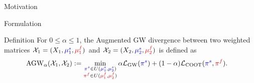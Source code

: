\documentclass{beamer}
\newcommand{\gw}{\text{GW}}
\newcommand{\coot}{\text{COOT}}
\newcommand{\agw}{\text{AGW}}
\newcommand{\cX}{\mathcal X}
\newcommand{\cL}{\mathcal L}
\newcommand{\pis}{{\color{blue}{\pi^s}}}
\newcommand{\pif}{{\color{red}{\pi^f}}}
\newcommand{\mfsrc}{{\color{red}{\mu_1^f}}}
\newcommand{\mftg}{{\color{red}{\mu_2^f}}}
\newcommand{\mssrc}{{\color{blue}{\mu_1^s}}}
\newcommand{\mstg}{{\color{blue}{\mu_2^s}}}
\begin{document}
\begin{frame}{Motivation}
\end{frame}

\begin{frame}{Formulation}
\scriptsize
\begin{block}{Definition}
  For $0\leq \alpha \leq 1$, the Augmented GW divergence between
  two weighted matrices $\cX_1 = (X_1, \mssrc, \mfsrc)$ and
  $\cX_2 = (X_2, \mstg, \mftg)$ is defined as
  \begin{align*}
    \label{eq:scootr}
    \agw_{\alpha}(\cX_1, \cX_2) &:=
    \min_{\substack{\pis \in U(\mssrc,\mstg) \\ \pif \in U(\mfsrc,\mftg)}}
    \alpha \cL_{\gw}(\pis) + (1-\alpha) \cL_{\coot}(\pis, \pif).
  \end{align*}
\end{block}



\end{frame}
\end{document}
